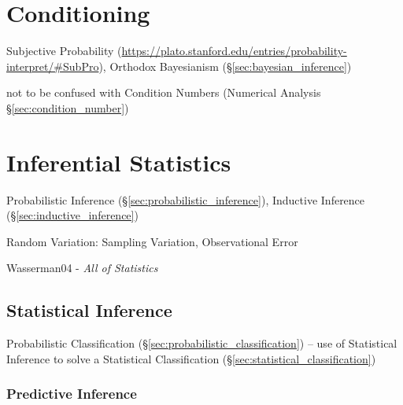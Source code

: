 \section{Conditioning}\label{sec:conditioning}


Subjective Probability
(\url{https://plato.stanford.edu/entries/probability-interpret/#SubPro}),
Orthodox Bayesianism (\S\ref{sec:bayesian_inference})

\fist not to be confused with Condition Numbers (Numerical Analysis
\S\ref{sec:condition_number})



\section{Inferential Statistics}\label{sec:inferential_statistics}

Probabilistic Inference
(\S\ref{sec:probabilistic_inference}), Inductive Inference
(\S\ref{sec:inductive_inference})

Random Variation: Sampling Variation, Observational Error

Wasserman04 - \emph{All of Statistics}



\subsection{Statistical Inference}\label{sec:statistical_inference}

Probabilistic Classification (\S\ref{sec:probabilistic_classification}) -- use
of Statistical Inference to solve a Statistical Classification
(\S\ref{sec:statistical_classification})



\subsubsection{Predictive Inference}\label{sec:predictive_inference}

